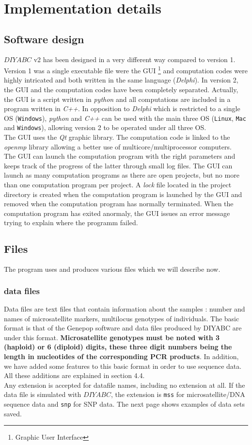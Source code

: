\clearpage
 \section{Implementation details}
\subsection{Software design}
$DIYABC$ v2 has been designed in a very different way compared to version 1. Version 1 was a single executable file were the GUI \footnote{Graphic User Interface} and computation codes were highly intricated and both written in the same language (\emph{Delphi}). In version 2, the GUI and the computation codes have been completely separated. Actually, the GUI is a script written in \emph{python} and all computations are included in a program written in \emph{C++}. In opposition to \emph{Delphi} which is restricted to a single OS (\texttt{Windows}), \textit{python} and \textit{C++} can be used with the main three OS (\texttt{Linux}, \texttt{Mac} and \texttt{Windows}), allowing version 2  to be operated under all three OS.\\
The GUI uses the \textit{Qt} graphic library. The computation code is linked to the \textit{openmp} library allowing a better use of multicore/multiprocessor computers.\\
The GUI can launch the computation program with the right parameters and keeps track of the progress of the latter through small log files. The GUI can launch as many computation programs as there are open projects, but no more than one computation program per project. A \textit{lock} file located in the project directory is created when the computation program is launched by the GUI and removed when the computation program has normally terminated. When the computation program has exited anormaly, the GUI issues an error message trying to explain where the programm failed.    
\subsection{Files}
The program uses and produces various files which we will describe now.
\subsubsection{data files}
Data files are text files that contain information about the samples : number and names of microsatellite markers, multilocus genotypes of individuals. The basic  format is that of the Genepop software \citep{RR1995} and data files produced by DIYABC are under this format.  \textbf{Microsatellite genotypes must be noted with 3 (haploid) or 6 (diploid) digits, these three digit numbers being the length in nucleotides of the corresponding PCR products}. In addition, we have added some features to this basic format in order to use sequence data. All these additions are explained in section 4.4.\\ 
Any extension is accepted for datafile names, including no extension at all. If the data file is simulated with $DIYABC$, the extension is \texttt{mss} for microsatellite/DNA sequence data and \texttt{snp} for SNP data. The next page shows examples of data sets saved.

